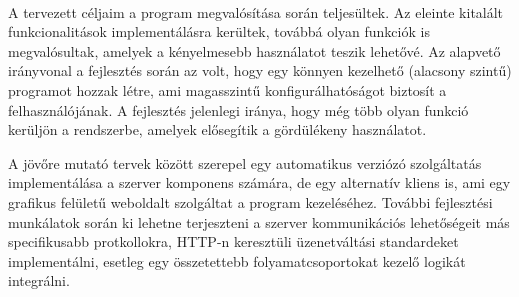 \documentclass[12pt]{report}
\begin{document}
\paragraph{}
A tervezett céljaim a program megvalósítása során teljesültek. Az eleinte kitalált funkcionalitások implementálásra kerültek, továbbá olyan funkciók is megvalósultak, amelyek a kényelmesebb használatot teszik lehetővé.
Az alapvető irányvonal a fejlesztés során az volt, hogy egy könnyen kezelhető (alacsony szintű) programot hozzak létre, ami magasszintű konfigurálhatóságot biztosít a felhasználójának.
A fejlesztés jelenlegi iránya, hogy még több olyan funkció kerüljön a rendszerbe, amelyek elősegítik a gördülékeny használatot. 

A jövőre mutató tervek között szerepel egy  automatikus verziózó szolgáltatás implementálása a szerver komponens számára, de egy alternatív kliens is, ami egy grafikus felületű weboldalt szolgáltat a program kezeléséhez.
További fejlesztési munkálatok során ki lehetne terjeszteni a szerver kommunikációs lehetőségeit más specifikusabb protkollokra, HTTP-n keresztüli üzenetváltási standardeket implementálni, esetleg egy összetettebb folyamatcsoportokat kezelő logikát integrálni.
\end{document}
